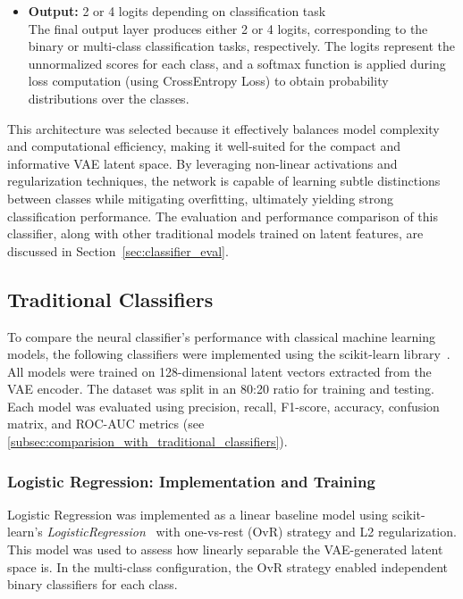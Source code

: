 \begin{itemize}
    \item \textbf{Output:} 2 or 4 logits depending on classification task \\
    The final output layer produces either 2 or 4 logits, corresponding to the binary or multi-class classification tasks, respectively. The logits represent the unnormalized scores for each class, and a softmax function is applied during loss computation (using CrossEntropy Loss) to obtain probability distributions over the classes.
\end{itemize}

This architecture was selected because it effectively balances model complexity and computational efficiency, making it well-suited for the compact and informative VAE latent space. By leveraging non-linear activations and regularization techniques, the network is capable of learning subtle distinctions between classes while mitigating overfitting, ultimately yielding strong classification performance. The evaluation and performance comparison of this classifier, along with other traditional models trained on latent features, are discussed in Section~\ref{sec:classifier_eval}.




\subsection{Traditional Classifiers}
\label{subsec:traditional_classifiers}

To compare the neural classifier's performance with classical machine learning models, the following classifiers were implemented using the scikit-learn library~\cite{scikit-learn}. All models were trained on 128-dimensional latent vectors extracted from the VAE encoder. The dataset was split in an 80:20 ratio for training and testing. Each model was evaluated using precision, recall, F1-score, accuracy, confusion matrix, and ROC-AUC metrics (see \cref{subsec:comparision_with_traditional_classifiers}).

\subsubsection{Logistic Regression: Implementation and Training}
\label{subsubsec:logistic_regression}
Logistic Regression was implemented as a linear baseline model using scikit-learn’s \textit{LogisticRegression}~\cite{scikit-learn} with one-vs-rest (OvR) strategy and L2 regularization. This model was used to assess how linearly separable the VAE-generated latent space is. In the multi-class configuration, the OvR strategy enabled independent binary classifiers for each class.

